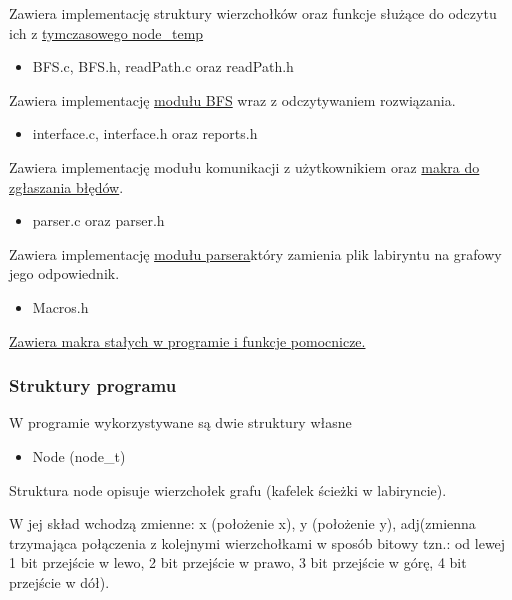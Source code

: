 \documentclass[
]{article}
\begin{document}
Zawiera implementację struktury wierzchołków oraz funkcje służące do
odczytu ich z \hyperref[pliki-tymczasowe] {tymczasowego node\_temp}

\begin{itemize}
\item
  BFS.c, BFS.h, readPath.c oraz readPath.h
\end{itemize}

Zawiera implementację  \hyperref[bfs]{modułu BFS} wraz z
odczytywaniem rozwiązania.

\begin{itemize}
\item
  interface.c, interface.h oraz reports.h
\end{itemize}

Zawiera implementację modułu komunikacji z użytkownikiem 
oraz \hyperref[moux17cliwe-bux142ux119dy]{makra do zgłaszania błędów}.

\begin{itemize}
\item
  parser.c oraz parser.h
\end{itemize}

Zawiera implementację \hyperref[parser]{modułu parsera}który
zamienia plik labiryntu na grafowy jego odpowiednik.

\begin{itemize}
\item
  Macros.h
\end{itemize}
\hyperref[staux142e-programu-i-funkcje-pomocnicze]{Zawiera makra stałych w programie i funkcje pomocnicze.} 

\hypertarget{struktury-programu}{%
\subsubsection{Struktury programu}\label{struktury-programu}}

W programie wykorzystywane są dwie struktury własne

\begin{itemize}
\item
  Node (node\_t)
\end{itemize}

Struktura node opisuje wierzchołek grafu (kafelek ścieżki w labiryncie).

W jej skład wchodzą zmienne: x (położenie x), y (położenie y),
adj(zmienna trzymająca połączenia z kolejnymi wierzchołkami w sposób
bitowy tzn.: od lewej 1 bit przejście w lewo, 2 bit przejście w prawo, 3
bit przejście w górę, 4 bit przejście w dół).
\end{document}
